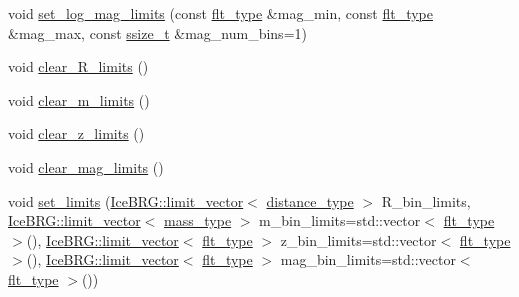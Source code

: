 \begin{DoxyCompactItemize}
\item 
void \hyperlink{classIceBRG_1_1pair__bins__summary_a0b2a787e58824b62ceb8c1885fbacac9}{set\-\_\-log\-\_\-mag\-\_\-limits} (const \hyperlink{lib_2IceBRG__main_2common_8h_ad0f130a56eeb944d9ef2692ee881ecc4}{flt\-\_\-type} \&mag\-\_\-min, const \hyperlink{lib_2IceBRG__main_2common_8h_ad0f130a56eeb944d9ef2692ee881ecc4}{flt\-\_\-type} \&mag\-\_\-max, const \hyperlink{lib_2IceBRG__main_2common_8h_ab322a3e50421dc5f0c43316b1b373592}{ssize\-\_\-t} \&mag\-\_\-num\-\_\-bins=1)
\item 
void \hyperlink{classIceBRG_1_1pair__bins__summary_aa7c0b185041754b838ad5708d19d20a9}{clear\-\_\-\-R\-\_\-limits} ()
\item 
void \hyperlink{classIceBRG_1_1pair__bins__summary_a08a19acd04c4b447212b9b6e2d9d2fd1}{clear\-\_\-m\-\_\-limits} ()
\item 
void \hyperlink{classIceBRG_1_1pair__bins__summary_a4b81ecfc23d7511f156bb0618af79745}{clear\-\_\-z\-\_\-limits} ()
\item 
void \hyperlink{classIceBRG_1_1pair__bins__summary_a365a1e2bdd23df20d79212ad824ae289}{clear\-\_\-mag\-\_\-limits} ()
\item 
void \hyperlink{classIceBRG_1_1pair__bins__summary_a956cd9635846601f12fca9fd66aea3db}{set\-\_\-limits} (\hyperlink{classIceBRG_1_1limit__vector}{Ice\-B\-R\-G\-::limit\-\_\-vector}$<$ \hyperlink{namespaceIceBRG_a45499647eb87e24c10ab32c628711cec}{distance\-\_\-type} $>$ R\-\_\-bin\-\_\-limits, \hyperlink{classIceBRG_1_1limit__vector}{Ice\-B\-R\-G\-::limit\-\_\-vector}$<$ \hyperlink{namespaceIceBRG_a1be72ac4918a9b029f2eefa084213e35}{mass\-\_\-type} $>$ m\-\_\-bin\-\_\-limits=std\-::vector$<$ \hyperlink{lib_2IceBRG__main_2common_8h_ad0f130a56eeb944d9ef2692ee881ecc4}{flt\-\_\-type} $>$(), \hyperlink{classIceBRG_1_1limit__vector}{Ice\-B\-R\-G\-::limit\-\_\-vector}$<$ \hyperlink{lib_2IceBRG__main_2common_8h_ad0f130a56eeb944d9ef2692ee881ecc4}{flt\-\_\-type} $>$ z\-\_\-bin\-\_\-limits=std\-::vector$<$ \hyperlink{lib_2IceBRG__main_2common_8h_ad0f130a56eeb944d9ef2692ee881ecc4}{flt\-\_\-type} $>$(), \hyperlink{classIceBRG_1_1limit__vector}{Ice\-B\-R\-G\-::limit\-\_\-vector}$<$ \hyperlink{lib_2IceBRG__main_2common_8h_ad0f130a56eeb944d9ef2692ee881ecc4}{flt\-\_\-type} $>$ mag\-\_\-bin\-\_\-limits=std\-::vector$<$ \hyperlink{lib_2IceBRG__main_2common_8h_ad0f130a56eeb944d9ef2692ee881ecc4}{flt\-\_\-type} $>$())
\item 

\end{DoxyCompactItemize}
